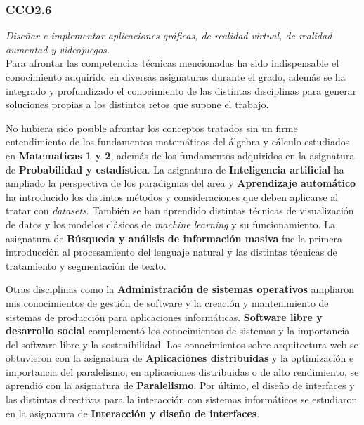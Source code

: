\subsubsection{CCO2.6}\textit{Diseñar e implementar aplicaciones gráficas, de realidad virtual, de realidad aumentad y videojuegos.}%
\\

Para afrontar las competencias técnicas mencionadas ha sido indispensable el conocimiento adquirido en diversas asignaturas durante el grado, además se ha integrado y profundizado el conocimiento de las distintas disciplinas para generar soluciones propias a los distintos retos que supone el trabajo.

No hubiera sido posible afrontar los conceptos tratados sin un firme entendimiento de los fundamentos matemáticos del álgebra y cálculo estudiados en \textbf{Matematicas 1 y 2}, además de los fundamentos adquiridos en la asignatura de \textbf{Probabilidad y estadística}.
La asignatura de \textbf{Inteligencia artificial} ha ampliado la perspectiva de los paradigmas del area y \textbf{Aprendizaje automático} ha introducido los distintos métodos y consideraciones que deben aplicarse al tratar con \textit{datasets}. También se han aprendido distintas técnicas de visualización de datos y los modelos clásicos de \textit{machine learning} y su funcionamiento.
La asignatura de \textbf{Búsqueda y análisis de información masiva} fue la primera introducción al procesamiento del lenguaje natural y las distintas técnicas de tratamiento y segmentación de texto.

Otras disciplinas como la \textbf{Administración de sistemas operativos} ampliaron mis conocimientos de gestión de software y la creación y mantenimiento de sistemas de producción para aplicaciones informáticas. \textbf{Software libre y desarrollo social} complementó los conocimientos de sistemas y la importancia del software libre y la sostenibilidad.
Los conocimientos sobre arquitectura web se obtuvieron con la asignatura de \textbf{Aplicaciones distribuidas} y la optimización e importancia del paralelismo, en aplicaciones distribuidas o de alto rendimiento, se aprendió con la asignatura de \textbf{Paralelismo}. Por último, el diseño de interfaces y las distintas directivas para la interacción con sistemas informáticos se estudiaron en la asignatura de \textbf{Interacción y diseño de interfaces}.
